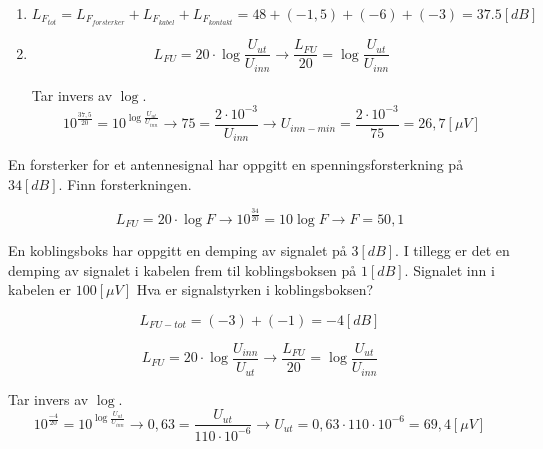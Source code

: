 \vspace{0.5cm} %

	\begin{solution}[name=Løsningsforslag oppgave]
		\begin{enumerate}[label=\roman*)]
		\item \[L_{F_{tot}}=L_{F_{forsterker}}+L_{F_{kabel}}+L_{F_{kontakt}} = 48+(-1,5)+(-6)+(-3) = 37.5[dB]\]
		\item \[L_{FU}=20 \cdot \log \frac{U_{ut}}{U_{inn}} \rightarrow \frac{L_{FU}}{20}= \log \frac{U_{ut}}{U_{inn}}\]
		
Tar invers av $\log$.
\[10^{\frac{37,5}{20}}=10^{\log \frac{U_{ut}}{U_{inn}}} \rightarrow 75=\frac{2 \cdot 10^{-3}}{U_{inn}} \rightarrow U_{inn-min}=\frac{2 \cdot 10^{-3}}{75}=26,7[ \mu V]\]
		
	\end{enumerate}
	
\end{solution}

\begin{question}[name=Oppgave, topic=forsterkning]
En forsterker for et antennesignal har oppgitt en spenningsforsterkning på $34[dB]$. Finn forsterkningen.
	
\end{question}

\vspace{0.5cm} %

\begin{solution}[name=Løsningsforslag oppgave]
\[L_{FU}=20 \cdot \log F \rightarrow 10^{\frac{34}{20}}= 10 \log F \rightarrow F=50,1 \]
	
\end{solution}

\begin{question}[name=Oppgave, topic=forsterkning]
En koblingsboks har oppgitt en demping av signalet på $3[dB]$. I tillegg er det en demping av signalet i kabelen frem til koblingsboksen på $1[dB]$. Signalet inn i kabelen er $100[\mu V]$ Hva er signalstyrken i koblingsboksen?
	
\end{question}

\vspace{0.5cm} %

\begin{solution}[name=Løsningsforslag oppgave]
\[L_{FU-tot}=(-3)+(-1)=-4[dB]\]
	
\[L_{FU} = 20 \cdot \log \frac{U_{inn}}{U_{ut}} \rightarrow \frac{L_{FU}}{20}= \log \frac{U_{ut}}{U_{inn}}\]

Tar invers av $\log$.
\[10^{\frac{-4}{20}}=10^{\log \frac {U_{ut}}{U_{inn}}} \rightarrow 0,63 = \frac{U_{ut}}{110 \cdot 10^{-6}} \rightarrow U_{ut}=0,63 \cdot 110 \cdot 10^{-6}=69,4[\mu V]\]

	
\end{solution}



\vspace{0.5cm} %